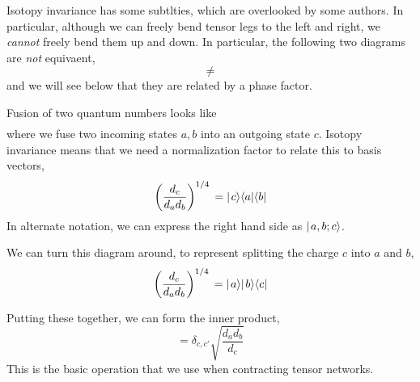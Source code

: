 \documentclass[12pt]{article}
\begin{document}
Isotopy invariance has some subtlties, which are overlooked by some authors. In particular, although
we can freely bend tensor legs to the left and right, we \emph{cannot} freely bend them up and down.
In particular, the following two diagrams are \emph{not} equivaent,
\begin{equation}
\begin{gathered}

\end{gathered}
\neq
\begin{gathered}

\end{gathered}
\label{eq:TwistedTime}
\end{equation}
and we will see below that they are related by a phase factor.

Fusion of two quantum numbers looks like
\begin{equation}
\begin{gathered}

\end{gathered}
\end{equation}
where we fuse two incoming states $a,b$ into an outgoing state $c$. 
Isotopy invariance means that we need a normalization factor to relate this to basis vectors,
\begin{equation}
\left(\frac{d_c}{d_a d_b} \right)^{1/4}
\begin{gathered}

\end{gathered}
= \ket{c} \bra{a}\bra{b}
\end{equation}
In alternate notation, we can express the right hand side as $\hbox{$\mid \! {a,b;c} \rangle$}$.

We can turn this diagram around, to represent splitting the charge $c$ into $a$ and $b$,
\begin{equation}
\left(\frac{d_c}{d_a d_b} \right)^{1/4}
\begin{gathered}

\end{gathered}
= \ket{a}\ket{b} \bra{c}
\end{equation}

Putting these together, we can form the inner product,
\begin{equation}
\begin{gathered}

\end{gathered}
= \delta_{c,c'} \sqrt{\frac{d_a d_b}{d_c}}
\begin{gathered}

\end{gathered}
\end{equation}
This is the basic operation that we use when contracting tensor networks.
\end{document}
